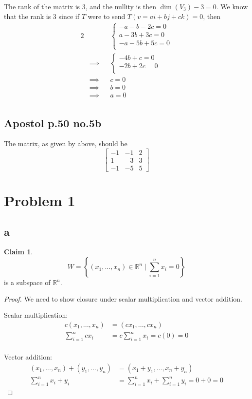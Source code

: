 \documentclass[12pt,letterpaper]{article}
\theoremstyle{definition}
\newtheorem*{claim}{Claim}
\newcommand{\R}{\mathbb{R}}
\begin{document}
The rank of the matrix is $3$, and the nullity is then $\dim(V_3) - 3 = 0$. We
know that the rank is $3$ since if $T$ were to send $T(v = ai + bj + ck) = 0$, then
\begin{alignat*}{2}
  && &\begin{cases}
    -a -b -2c = 0 \\
    a -3b + 3c = 0 \\
    -a -5b + 5c = 0 \\
  \end{cases} \\
  &\implies& &\begin{cases}
    -4b +c = 0 \\
    -2b + 2c = 0 \\
  \end{cases} \\
  &\implies& &c = 0 \\
  &\implies& &b = 0 \\
  &\implies& &a = 0 \\
\end{alignat*}

\subsection*{Apostol p.50 no.5b}

The matrix, as given by above, should be
\[
  \begin{bmatrix}
    -1 & -1 & 2 \\
    1 & -3 & 3 \\
    -1 & -5 & 5
  \end{bmatrix}
\]

\section*{Problem 1}
\subsection*{a}

\begin{claim}
  \[
    W = \left\{  (x_1, ..., x_n) \in \R^n \mid \sum_{i=1}^nx_i = 0 \right\}
  \]
  is a subspace of $\R^n$.
\end{claim}

\begin{proof}
  We need to show closure under scalar multiplication and vector addition.

  Scalar multiplication:
  \begin{align*}
    c(x_1, ..., x_n) &= (cx_1, ..., cx_n) \\
    \sum_{i=1}^ncx_i &= c\sum_{i=1}^nx_i = c(0) = 0 \\
  \end{align*}

  Vector addition:
  \begin{align*}
    (x_1, ..., x_n) + (y_1, ..., y_n) &= (x_1 + y_1, ..., x_n + y_n) \\
    \sum_{i=1}^nx_i + y_i &= \sum_{i=1}^nx_i + \sum_{i=1}^ny_i = 0 + 0 = 0
  \end{align*}
\end{proof}
\end{document}
